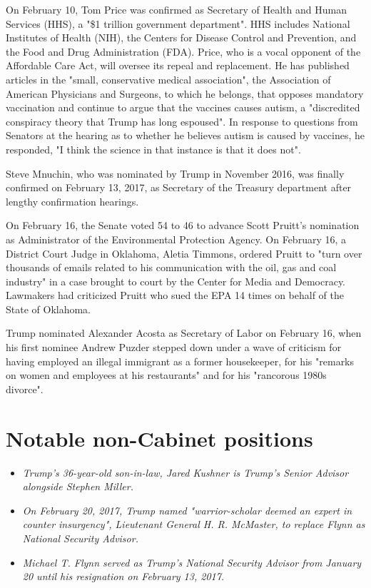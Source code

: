 On February 10, Tom Price was confirmed as Secretary of Health and Human
Services (HHS), a "\$1 trillion government department". HHS includes
National Institutes of Health (NIH), the Centers for Disease Control and
Prevention, and the Food and Drug Administration (FDA). Price, who is a
vocal opponent of the Affordable Care Act, will oversee its repeal and
replacement. He has published articles in the "small, conservative
medical association", the Association of American Physicians and
Surgeons, to which he belongs, that opposes mandatory vaccination and
continue to argue that the vaccines causes autism, a "discredited
conspiracy theory that Trump has long espoused". In response to
questions from Senators at the hearing as to whether he believes autism
is caused by vaccines, he responded, "I think the science in that
instance is that it does not".

Steve Mnuchin, who was nominated by Trump in November 2016, was finally
confirmed on February 13, 2017, as Secretary of the Treasury department
after lengthy confirmation hearings.

On February 16, the Senate voted 54 to 46 to advance Scott Pruitt's
nomination as Administrator of the Environmental Protection Agency. On
February 16, a District Court Judge in Oklahoma, Aletia Timmons, ordered
Pruitt to "turn over thousands of emails related to his communication
with the oil, gas and coal industry" in a case brought to court by the
Center for Media and Democracy. Lawmakers had criticized Pruitt who sued
the EPA 14 times on behalf of the State of Oklahoma.

Trump nominated Alexander Acosta as Secretary of Labor on February 16,
when his first nominee Andrew Puzder stepped down under a wave of
criticism for having employed an illegal immigrant as a former
housekeeper, for his "remarks on women and employees at his restaurants"
and for his "rancorous 1980s divorce".

\section{Notable non-Cabinet
positions}\label{notable-non-cabinet-positions}

\begin{itemize}
\item
  \emph{Trump's 36-year-old son-in-law, Jared Kushner is Trump's Senior
  Advisor alongside Stephen Miller.}
\item
  \emph{On February 20, 2017, Trump named "warrior-scholar deemed an
  expert in counter insurgency", Lieutenant General H. R. McMaster, to
  replace Flynn as National Security Advisor.}
\item
  \emph{Michael T. Flynn served as Trump's National Security Advisor
  from January 20 until his resignation on February 13, 2017.}
\end{itemize}

